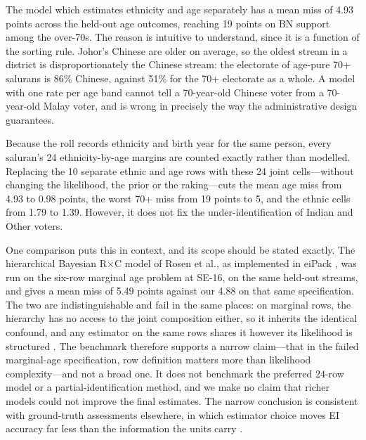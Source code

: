 \documentclass[11pt]{article}
\begin{document}
The model which estimates ethnicity and age separately has a mean miss of 4.93 points across the held-out age outcomes, reaching 19 points on BN support among the over-70s. The reason is intuitive to understand, since it is a function of the sorting rule. Johor's Chinese are older on average, so the oldest stream in a district is disproportionately the Chinese stream: the electorate of age-pure 70+ salurans is 86\% Chinese, against 51\% for the 70+ electorate as a whole. A model with one rate per age band cannot tell a 70-year-old Chinese voter from a 70-year-old Malay voter, and is wrong in precisely the way the administrative design guarantees.

Because the roll records ethnicity and birth year for the same person, every saluran's 24 ethnicity-by-age margins are counted exactly rather than modelled. Replacing the 10 separate ethnic and age rows with these 24 joint cells---without changing the likelihood, the prior or the raking---cuts the mean age miss from 4.93 to 0.98 points, the worst 70+ miss from 19 points to 5, and the ethnic cells from 1.79 to 1.39. However, it does not fix the under-identification of Indian and Other voters.

One comparison puts this in context, and its scope should be stated exactly. The hierarchical Bayesian R$\times$C model of Rosen et al.\cite{rosen2001}, as implemented in eiPack \cite{eipack2007}, was run on the six-row marginal age problem at SE-16, on the same held-out streams, and gives a mean miss of 5.49 points against our 4.88 on that same specification. The two are indistinguishable and fail in the same places: on marginal rows, the hierarchy has no access to the joint composition either, so it inherits the identical confound, and any estimator on the same rows shares it however its likelihood is structured \cite{greinerquinn2009,imailustrauss2008}. The benchmark therefore supports a narrow claim---that in the failed marginal-age specification, row definition matters more than likelihood complexity---and not a broad one. It does not benchmark the preferred 24-row model or a partial-identification method, and we make no claim that richer models could not improve the final estimates. The narrow conclusion is consistent with ground-truth assessments elsewhere, in which estimator choice moves EI accuracy far less than the information the units carry \cite{klima2016,plesciadesio2018}.
\end{document}
